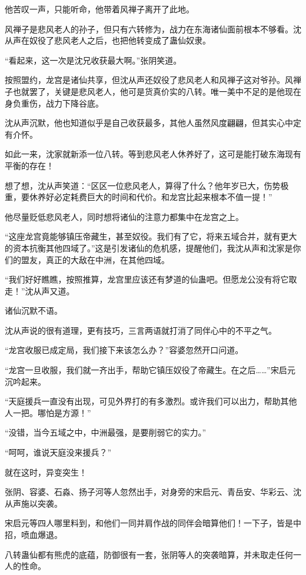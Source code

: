 \begin{this_body}
他苦叹一声，只能听命，他带着风禅子离开了此地。

风禅子是悲风老人的孙子，但只有六转修为，战力在东海诸仙面前根本不够看。沈从声在奴役了悲风老人之后，也把他转变成了蛊仙奴隶。

“看起来，这一次是沈兄收获最大啊。”张阴笑道。

按照盟约，龙宫是诸仙共享，但沈从声还奴役了悲风老人和风禅子这对爷孙。风禅子也就罢了，关键是悲风老人，他可是货真价实的八转。唯一美中不足的是他现在身负重伤，战力下降谷底。

沈从声沉默，他也知道似乎是自己收获最多，其他人虽然风度翩翩，但其实心中定有介怀。

如此一来，沈家就新添一位八转。等到悲风老人休养好了，这可是能打破东海现有平衡的存在！

想了想，沈从声笑道：“区区一位悲风老人，算得了什么？他年岁已大，伤势极重，要休养好必定耗费巨大的时间和代价。和龙宫比起来根本不值一提！”

他尽量贬低悲风老人，同时想将诸仙的注意力都集中在龙宫之上。

“这座龙宫竟能够镇压帝藏生，甚至奴役。我们有了它，将来五域合并，就有更大的资本抗衡其他四域了。”这是引发诸仙的危机感，提醒他们，我沈从声和沈家是你们的盟友，真正的大敌在中洲，在其他四域。

“我们好好瞧瞧，按照推算，龙宫里应该还有梦道的仙蛊吧。但愿龙公没有将它取走！”沈从声又道。

诸仙沉默不语。

沈从声说的很有道理，更有技巧，三言两语就打消了同伴心中的不平之气。

“龙宫收服已成定局，我们接下来该怎么办？”容婆忽然开口问道。

“龙宫一旦收服，我们就一齐出手，帮助它镇压奴役了帝藏生。在之后……”宋启元沉吟起来。

“天庭援兵一直没有出现，可见外界打的有多激烈。或许我们可以出力，帮助其他人一把。哪怕是方源！”

“没错，当今五域之中，中洲最强，是要削弱它的实力。”

“呵呵，谁说天庭没来援兵？”

就在这时，异变突生！

张阴、容婆、石淼、扬子河等人忽然出手，对身旁的宋启元、青岳安、华彩云、沈从声施以突袭。

宋启元等四人哪里料到，和他们一同并肩作战的同伴会暗算他们！一下子，皆是中招，喷血爆退。

八转蛊仙都有熊虎的底蕴，防御很有一套，张阴等人的突袭暗算，并未取走任何一人的性命。


\end{this_body}
